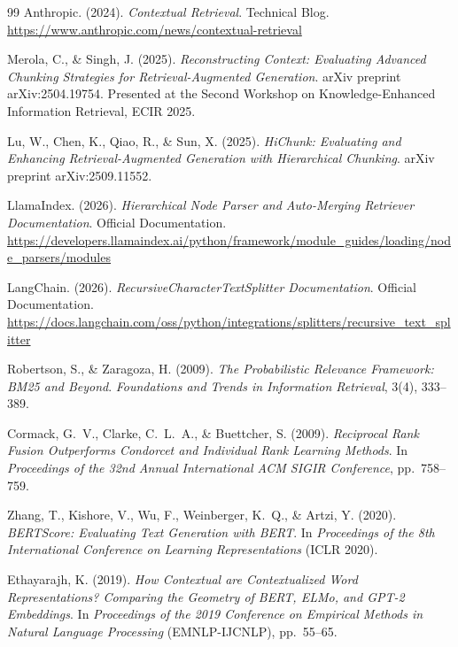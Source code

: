 \documentclass[12pt,a4paper]{report}
\theoremstyle{plain}
\theoremstyle{definition}
\begin{document}
\begin{thebibliography}{99}
		Anthropic. (2024).
		\textit{Contextual Retrieval}.
		Technical Blog.
		\url{https://www.anthropic.com/news/contextual-retrieval}
		
		Merola, C., \& Singh, J. (2025).
		\textit{Reconstructing Context: Evaluating Advanced Chunking Strategies for
			Retrieval-Augmented Generation}.
		arXiv preprint arXiv:2504.19754.
		Presented at the Second Workshop on Knowledge-Enhanced Information Retrieval,
		ECIR 2025.
		
		Lu, W., Chen, K., Qiao, R., \& Sun, X. (2025).
		\textit{HiChunk: Evaluating and Enhancing Retrieval-Augmented Generation
			with Hierarchical Chunking}.
		arXiv preprint arXiv:2509.11552.
		
		LlamaIndex. (2026).
		\textit{Hierarchical Node Parser and Auto-Merging Retriever Documentation}.
		Official Documentation.
		\url{https://developers.llamaindex.ai/python/framework/module_guides/loading/node_parsers/modules}
		
		LangChain. (2026).
		\textit{RecursiveCharacterTextSplitter Documentation}.
		Official Documentation.
		\url{https://docs.langchain.com/oss/python/integrations/splitters/recursive_text_splitter}
		
		Robertson, S., \& Zaragoza, H. (2009).
		\textit{The Probabilistic Relevance Framework: BM25 and Beyond}.
		\textit{Foundations and Trends in Information Retrieval}, 3(4), 333--389.
		
		Cormack, G.~V., Clarke, C.~L.~A., \& Buettcher, S. (2009).
		\textit{Reciprocal Rank Fusion Outperforms Condorcet and Individual Rank
			Learning Methods}.
		In \textit{Proceedings of the 32nd Annual International ACM SIGIR Conference},
		pp.\ 758--759.
		
		Zhang, T., Kishore, V., Wu, F., Weinberger, K.~Q., \& Artzi, Y. (2020).
		\textit{BERTScore: Evaluating Text Generation with BERT}.
		In \textit{Proceedings of the 8th International Conference on Learning
			Representations} (ICLR 2020).
		
		Ethayarajh, K. (2019).
		\textit{How Contextual are Contextualized Word Representations?
			Comparing the Geometry of BERT, ELMo, and GPT-2 Embeddings}.
		In \textit{Proceedings of the 2019 Conference on Empirical Methods in
			Natural Language Processing} (EMNLP-IJCNLP), pp.\ 55--65.
		
	\end{thebibliography}
	
\end{document}
